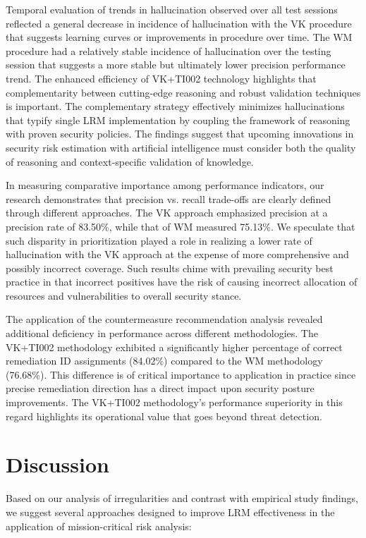 \documentclass[sigconf]{acmart}
\begin{document}
Temporal evaluation of trends in hallucination observed over all test sessions reflected a general decrease in incidence of hallucination with the VK procedure that suggests learning curves or improvements in procedure over time. The WM procedure had a relatively stable incidence of hallucination over the testing session that suggests a more stable but ultimately lower precision performance trend. The enhanced efficiency of VK+TI002 technology highlights that complementarity between cutting-edge reasoning and robust validation techniques is important. The complementary strategy effectively minimizes hallucinations that typify single LRM implementation by coupling the framework of reasoning with proven security policies. The findings suggest that upcoming innovations in security risk estimation with artificial intelligence must consider both the quality of reasoning and context-specific validation of knowledge.

In measuring comparative importance among performance indicators, our research demonstrates that precision vs. recall trade-offs are clearly defined through different approaches. The VK approach emphasized precision at a precision rate of 83.50\%, while that of WM measured 75.13\%. We speculate that such disparity in prioritization played a role in realizing a lower rate of hallucination with the VK approach at the expense of more comprehensive and possibly incorrect coverage. Such results chime with prevailing security best practice in that incorrect positives have the risk of causing incorrect allocation of resources and vulnerabilities to overall security stance.

The application of the countermeasure recommendation analysis revealed additional deficiency in performance across different methodologies. The VK+TI002 methodology exhibited a significantly higher percentage of correct remediation ID assignments (84.02\%) compared to the WM methodology (76.68\%). This difference is of critical importance to application in practice since precise remediation direction has a direct impact upon security posture improvements. The VK+TI002 methodology's performance superiority in this regard highlights its operational value that goes beyond threat detection.

\section{Discussion}
Based on our analysis of irregularities and contrast with empirical study findings, we suggest several approaches designed to improve LRM effectiveness in the application of mission-critical risk analysis:
\end{document}
